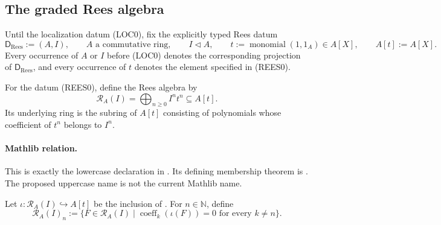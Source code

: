 \subsection{The graded Rees algebra}

Until the localization datum (LOC0), fix the explicitly typed Rees datum
\[
  \mathsf D_{\mathrm{Rees}}:=(A,I),\qquad
  A\text{ a commutative ring},\qquad I\triangleleft A,\qquad
  t:=\operatorname{monomial}(1,1_A)\in A[X],\qquad A[t]:=A[X].      \tag{REES0}
\]
Every occurrence of $A$ or $I$ before (LOC0) denotes the corresponding
projection of $\mathsf D_{\mathrm{Rees}}$, and every occurrence of $t$ denotes
the element specified in (REES0).

\begin{definition}
  \label{def:nagata-rees-algebra}

  For the datum (REES0), define the Rees algebra by
  \[
    \mathcal R_A(I)=\bigoplus_{n\geq 0}I^nt^n\subseteq A[t].
  \]
  Its underlying ring is the subring of $A[t]$ consisting of polynomials whose
  coefficient of $t^n$ belongs to $I^n$.

  \paragraph{Mathlib relation.}
  This is exactly the lowercase declaration
  \texttt{} in
  \texttt{}.  Its defining
  membership theorem is \texttt{}.  The
  proposed uppercase name \texttt{} is not the
  current Mathlib name.
\end{definition}

\begin{definition}
  \label{def:nagata-rees-piece}

  Let $\iota\colon\mathcal R_A(I)\hookrightarrow A[t]$ be the inclusion of
  .  For $n\in\mathbb N$, define
  \[
    \mathcal R_A(I)_n:=
    \{F\in\mathcal R_A(I)\mid
      \operatorname{coeff}_k(\iota(F))=0\text{ for every }k\ne n\}.
  \]
\end{definition}

